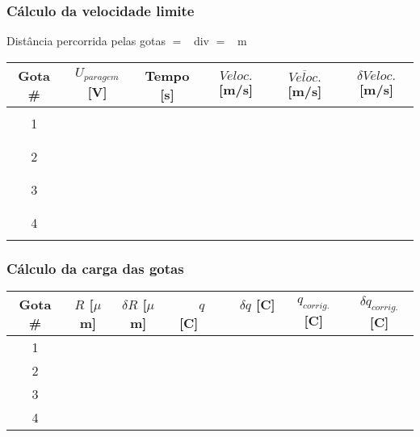 \documentclass[a4paper,12pt]{article}  %
\begin{document}
\subsubsection{\sf Cálculo da velocidade limite}
\label{sec:vlim}
\noindent  Distância percorrida pelas gotas $=$~\underline{\makebox[1cm][r]{~}} div $=$~\underline{\makebox[2cm][r]{~}} m

\begin{center}
	\begin{tabular}{|c|c|c|c|c|c|}
	\hline
	Gota \#  & $U_{paragem}$ [V] & Tempo [s] & $Veloc.$  [m/s]& $\overline{Veloc.}$ [m/s]	& $\delta Veloc.$ [m/s]  \\
	\hline
	  &  &  & &  & \\ \cline{2-4}
	1 &  & & &  & \\ \cline{2-4}
	  &  &  & &  & \\  \hline
	  &  &  & &  & \\ \cline{2-4}
	2 &  & & &  & \\ \cline{2-4}
	  &  &  & &  & \\ \hline
	  &  &  & &  & \\ \cline{2-4}
	3 &  & & &  & \\ \cline{2-4}
	  &  &  & &  & \\ \hline
	  &  &  & &  & \\ \cline{2-4}
	4 &  & & &  & \\ \cline{2-4}
	  &  &  & &  & \\ \hline
 	\end{tabular}
\end{center}

\vspace{4cm}

\subsubsection{\sf Cálculo da carga das gotas}
\label{sec:calc}
\begin{center}
	\renewcommand{\arraystretch}{1.5}
	\begin{tabular}{|c|c|c|c|c|c|c|}
	\hline
	Gota \#  & $R$ [$\mu$m] & $\delta R$  [$\mu$m] & \,\,\,\,\,\,$q$ [C]\,\,\,\,\,\, & \,\,\,$\delta q$ [C] \,\,\,& $q_{corrig.}$ [C] & $\delta q_{corrig.}$ [C] \\ \hline
	 1 & &  &  & &  &  \\ \hline
	 2 & &  &  & &  & \\ \hline
	 3 & &  &  & &  & \\ \hline
	 4 & &  &  & &  & \\ \hline
 	\end{tabular}
\end{center}
\end{document}
